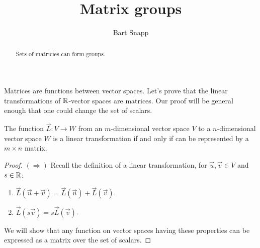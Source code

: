 \documentclass{ximera}
\author{Bart Snapp}
\title{Matrix groups}
\begin{document}
\begin{abstract}
  Sets of matricies can form groups.
\end{abstract}
\maketitle

Matrices are functions between vector spaces. Let's prove that the
linear transformations of $\mathbb R$-vector spaces are matrices. Our proof
will be general enough that one could change the set of scalars.

\begin{lemma}
  The function $\vec{L}: V \to W$ from an $m$-dimensional vector space
  $V$ to a $n$-dimensional vector space $W$ is a linear transformation
  if and only if can be represented by a $m\times n$ matrix.
  \begin{proof}
    $(\Rightarrow)$ Recall the definition of a linear transformation,
    for $\vec{u},\vec{v}\in V$ and $s\in \mathbb R$:
    \begin{enumerate}
    \item $\vec{L}(\vec{u}+\vec{v}) = \vec{L}(\vec{u})+\vec{L}(\vec{v})$.
    \item $\vec{L}(s \vec{v}) = s\vec{L}(\vec{v})$.
    \end{enumerate}
    We will show that any function on vector spaces having these
    properties can be expressed as a matrix over the set of scalars.


\end{proof}
\end{lemma}
\end{document}
